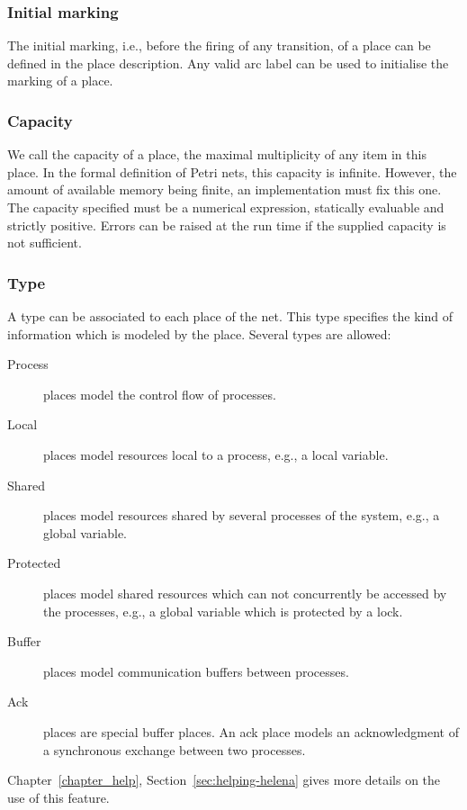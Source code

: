 \placedomaindef


\subsubsection{Initial marking}
The initial marking, i.e., before the firing of any transition, of a
place can be defined in the place description.  Any valid arc label
can be used to initialise the marking of a place.\\

\initialmarkingdef


\subsubsection{Capacity}
We call the capacity of a place, the maximal multiplicity of any item
in this place.  In the formal definition of Petri nets, this capacity
is infinite.  However, the amount of available memory being finite, an
implementation must fix this one.  The capacity specified must be a
numerical expression, statically evaluable and strictly positive.
Errors can be raised at the run time if the supplied capacity is not
sufficient.\\

\capacitydef

\subsubsection{Type}
A type can be associated to each place of the net.  This type
specifies the kind of information which is modeled by the place.
Several types are allowed:
\begin{description}
\item[Process] places model the control flow of processes.
\item[Local] places model resources local to a process, e.g., a
local variable.
\item[Shared] places model resources shared by several processes of the
  system, e.g., a global variable.
\item[Protected] places model shared resources which can not
  concurrently be accessed by the processes, e.g., a global variable
  which is protected by a lock.
\item[Buffer] places model communication buffers between processes.
\item[Ack] places are special buffer places.
  An ack place models an acknowledgment of a synchronous exchange between two
  processes.
\end{description}
Chapter~\ref{chapter_help}, Section~\ref{sec:helping-helena} gives
more details on the use of this feature.\\

